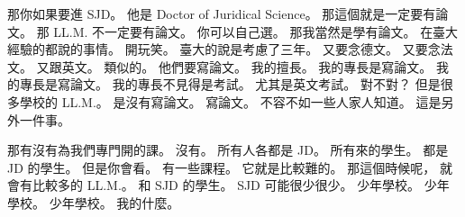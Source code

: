 \hypertarget{c01:cue:2810}{}那你如果要進 SJD。
\hypertarget{c01:cue:2811}{}他是 Doctor of Juridical Science。
\hypertarget{c01:cue:2812}{}那這個就是一定要有論文。
\hypertarget{c01:cue:2813}{}那 LL.M. 不一定要有論文。
\hypertarget{c01:cue:2814}{}你可以自己選。
\hypertarget{c01:cue:2815}{}那我當然是學有論文。
\hypertarget{c01:cue:2816}{}在臺大經驗的都說的事情。
\hypertarget{c01:cue:2817}{}開玩笑。
\hypertarget{c01:cue:2818}{}臺大的說是考慮了三年。
\hypertarget{c01:cue:2819}{}又要念德文。
\hypertarget{c01:cue:2820}{}又要念法文。
\hypertarget{c01:cue:2821}{}又跟英文。
\hypertarget{c01:cue:2822}{}類似的。
\hypertarget{c01:cue:2823}{}他們要寫論文。
\hypertarget{c01:cue:2824}{}我的擅長。
\hypertarget{c01:cue:2825}{}我的專長是寫論文。
\hypertarget{c01:cue:2826}{}我的專長是寫論文。
\hypertarget{c01:cue:2827}{}我的專長不見得是考試。
\hypertarget{c01:cue:2828}{}尤其是英文考試。
\hypertarget{c01:cue:2829}{}對不對？
\hypertarget{c01:cue:2830}{}但是很多學校的 LL.M.。
\hypertarget{c01:cue:2831}{}是沒有寫論文。
\hypertarget{c01:cue:2832}{}寫論文。
\hypertarget{c01:cue:2833}{}不容不如一些人家人知道。
\hypertarget{c01:cue:2834}{}這是另外一件事。

\hypertarget{c01:cue:2835}{}那有沒有為我們專門開的課。
\hypertarget{c01:cue:2836}{}沒有。
\hypertarget{c01:cue:2837}{}所有人各都是 JD。
\hypertarget{c01:cue:2838}{}所有來的學生。
\hypertarget{c01:cue:2839}{}都是 JD 的學生。
\hypertarget{c01:cue:2840}{}但是你會看。
\hypertarget{c01:cue:2841}{}有一些課程。
\hypertarget{c01:cue:2842}{}它就是比較難的。
\hypertarget{c01:cue:2843}{}那這個時候呢，
\hypertarget{c01:cue:2844}{}就會有比較多的 LL.M.。
\hypertarget{c01:cue:2845}{}和 SJD 的學生。
\hypertarget{c01:cue:2846}{}SJD 可能很少很少。
\hypertarget{c01:cue:2847}{}少年學校。
\hypertarget{c01:cue:2848}{}少年學校。
\hypertarget{c01:cue:2849}{}少年學校。
\hypertarget{c01:cue:2850}{}我的什麼。

